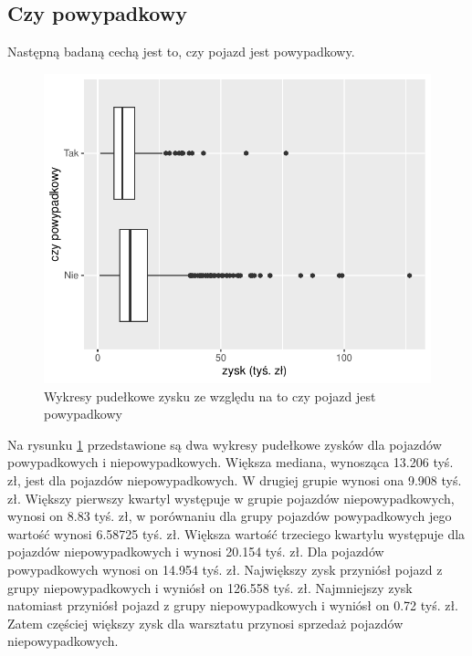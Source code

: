 \documentclass{article}\usepackage[]{graphicx}\usepackage[]{xcolor}
\makeatletter
\def\maxwidth{ %
  \ifdim\Gin@nat@width>\linewidth
    \linewidth
  \else
    \Gin@nat@width
  \fi
}
\newenvironment{knitrout}{}{} %
\makeatother
\begin{document}
\subsection{Czy powypadkowy}

Następną badaną cechą jest to, czy pojazd jest powypadkowy.

\begin{knitrout}
\color{fgcolor}\begin{figure}[H]

{\centering \includegraphics[width=\maxwidth]{figure/fig_wypadkowy-1} 

}

\caption[Wykresy pudełkowe zysku ze względu na to czy pojazd jest powypadkowy]{Wykresy pudełkowe zysku ze względu na to czy pojazd jest powypadkowy}\label{fig:fig_wypadkowy}
\end{figure}

\end{knitrout}

Na rysunku \ref{fig:fig_wypadkowy} przedstawione są dwa wykresy pudełkowe zysków dla pojazdów powypadkowych i niepowypadkowych. Większa mediana, wynosząca 13.206 tyś. zł, jest dla pojazdów niepowypadkowych. W drugiej grupie wynosi ona 9.908 tyś. zł. 
Większy pierwszy kwartyl występuje w grupie pojazdów niepowypadkowych, wynosi on 8.83 tyś. zł, w porównaniu dla grupy pojazdów powypadkowych jego wartość wynosi 6.58725 tyś. zł.
Większa wartość trzeciego kwartylu występuje dla pojazdów niepowypadkowych i wynosi 20.154 tyś. zł. Dla pojazdów powypadkowych wynosi on 14.954 tyś. zł.
Największy zysk przyniósł pojazd z grupy niepowypadkowych i wyniósł on 126.558 tyś. zł. 
Najmniejszy zysk natomiast przyniósł pojazd z grupy niepowypadkowych i wyniósł on 0.72 tyś. zł. Zatem częściej większy zysk dla warsztatu przynosi sprzedaż pojazdów niepowypadkowych. 
\end{document}
